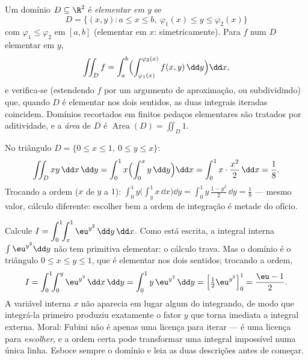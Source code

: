 \begin{definition}\label{def:b2:multint:domain}
Um domínio $D \subseteq \R^2$ é \emph{elementar em $y$} se
\[
D = \{(x, y) : a \leq x \leq b,\
\varphi_1(x) \leq y \leq \varphi_2(x)\}
\]
com $\varphi_1 \leq \varphi_2$  em $[a,b]$
(elementar em $x$: simetricamente). Para $f$  num
$D$ elementar em $y$,
\[
\iint_D f
= \int_a^b\Bigl(
\int_{\varphi_1(x)}^{\varphi_2(x)} f(x,y)\,\dd y\Bigr)\dd x ,
\]
e verifica-se (estendendo $f$ por um argumento de aproximação, ou
subdividindo) que, quando $D$ é elementar nos dois sentidos, as
duas integrais iteradas coincidem. Domínios recortados em finitos
pedaços elementares são tratados por aditividade, e a
\emph{área} de $D$ é $\operatorname
{Area}(D) = \iint_D 1$.
\end{definition}

\begin{example}\label{ex:b2:multint:triangle}
No triângulo $D = \{0 \leq x \leq 1,\ 0 \leq y \leq x\}$:
\[
\iint_D xy \,\dd x\,\dd y
= \int_0^1 x\Bigl(\int_0^x y\,\dd y\Bigr)\dd x
= \int_0^1 x\cdot\frac{x^2}{2}\,\dd x = \frac18 .
\]
Trocando a ordem ($x$ de $y$ a $1$): $\int_0^1
y\bigl(\int_y^1 x\,\dd x\bigr)\dd y = \int_0^1
y\,\frac{1 - y^2}{2}\,\dd y = \frac18$ --- mesmo valor, cálculo
diferente: escolher bem a ordem de integração é metade do
ofício.
\end{example}

\begin{example}\label{ex:b2:multint:swaporder}
Calcule $I = \displaystyle\int_0^1\!\!\int_x^1
\eu^{y^2}\,\dd y\,\dd x$. Como está escrita, a integral interna
$\int\eu^{y^2}\dd y$ não tem primitiva elementar: o
cálculo trava. Mas o domínio é o triângulo $0 \leq
x \leq y \leq 1$, que é elementar nos dois sentidos;
trocando a ordem,
\[
I = \int_0^1\!\!\int_0^y \eu^{y^2}\,\dd x\,\dd y
= \int_0^1 y\,\eu^{y^2}\,\dd y
= \Bigl[\tfrac12\eu^{y^2}\Bigr]_0^1 = \frac{\eu - 1}{2} .
\]
A variável interna $x$ não aparecia em lugar algum do integrando, de modo que
integrá-la primeiro produziu exatamente o fator $y$ que
torna imediata a integral externa. Moral: Fubini não é apenas
uma licença para iterar --- é uma licença para \emph{escolher},
e a ordem certa pode transformar uma integral impossível numa
única linha. Esboce sempre o domínio e leia as duas
descrições antes de começar.
\end{example}

